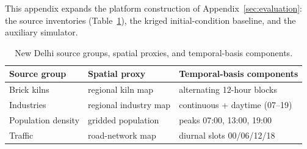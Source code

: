 This appendix expands the platform construction of
Appendix~\ref{sec:evaluation}: the source inventories
(Table~\ref{tab:new_delhi_inventories}), the kriged initial-condition baseline,
and the auxiliary simulator.

\begin{table}[t]
\centering
\small
\setlength{\tabcolsep}{4pt}
\caption{New Delhi source groups, spatial proxies, and temporal-basis components.}
\label{tab:new_delhi_inventories}
\begin{tabularx}{\columnwidth}{l
  >{\raggedright\arraybackslash}X
  >{\raggedright\arraybackslash}X}
\toprule
Source group & Spatial proxy & Temporal-basis components \\
\midrule
Brick kilns & regional kiln map & alternating 12-hour blocks \\
Industries & regional industry map & continuous + daytime (07--19) \\
Population density & gridded population & peaks 07:00, 13:00, 19:00 \\
Traffic & road-network map & diurnal slots 00/06/12/18 \\
\bottomrule
\end{tabularx}
\end{table}

